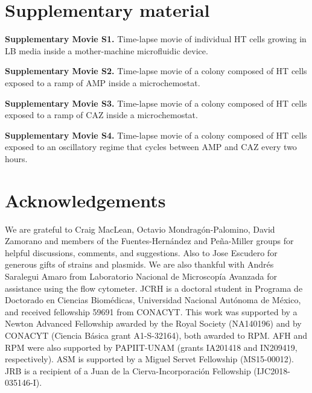 \documentclass[fleqn,12pt]{wlscirep}
\begin{document}
\section*{Supplementary material}

\textbf{Supplementary Movie S1.} Time-lapse movie of individual HT cells growing in LB media inside a mother-machine microfluidic device.

\textbf{Supplementary Movie S2.} Time-lapse movie of a colony composed of HT cells exposed to a ramp of AMP inside a microchemostat.

\textbf{Supplementary Movie S3.} Time-lapse movie of a colony composed of HT cells exposed to a ramp of CAZ inside a microchemostat.

\textbf{Supplementary Movie S4.} Time-lapse movie of a colony composed of HT cells exposed to an oscillatory regime that cycles between AMP and CAZ every two hours.
\section*{Acknowledgements}

We are grateful to Craig MacLean, Octavio Mondrag\'on-Palomino, David Zamorano and members of the Fuentes-Hern\'andez and Pe\~na-Miller groups for helpful discussions, comments, and suggestions. Also to Jose Escudero for generous gifts of strains and plasmids.
We are also thankful with Andr\'es Saralegui Amaro from Laboratorio Nacional de Microscop\'ia Avanzada for assistance using the flow cytometer. JCRH is a doctoral student in Programa de Doctorado en Ciencias Biom\'edicas, Universidad Nacional Aut\'onoma de M\'exico, and received fellowship 59691 from CONACYT. 
This work was supported by a Newton Advanced Fellowship awarded by the Royal Society (NA140196) and by CONACYT (Ciencia B\'asica grant A1-S-32164), both awarded to RPM. AFH and RPM were also supported by PAPIIT-UNAM (grants IA201418 and IN209419, respectively). ASM is supported by a Miguel Servet Fellowship (MS15-00012). JRB is a recipient of a Juan de la Cierva-Incorporaci\'on Fellowship (IJC2018-035146-I). 

\small

\end{document}
